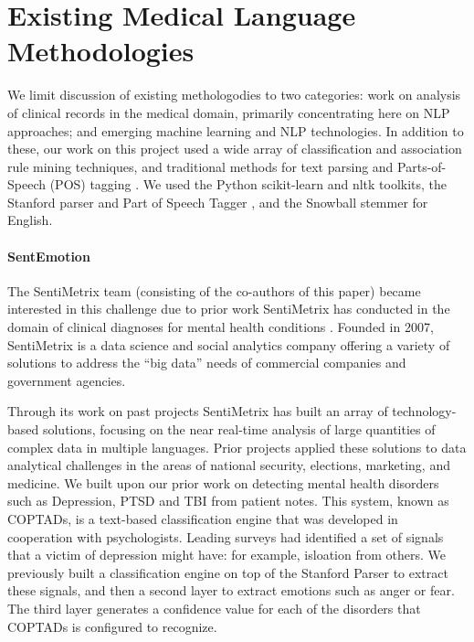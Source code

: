 \section{Existing Medical Language Methodologies}

We limit discussion of existing methologodies to two categories:
work on analysis of clinical records in the medical domain, primarily concentrating
here on NLP approaches; and emerging machine learning and NLP technologies.
In addition to these, our work on this project used a wide array of 
classification \cite{wu08} and association rule mining \cite{fpgrowth} techniques, and
traditional methods for text parsing and Parts-of-Speech (POS) tagging \cite{stanfordparser}. 
We used the Python \textsf{scikit-learn} \cite{scikit-learn} 
and \textsf{nltk} \cite{nltk} toolkits, the Stanford parser and Part of Speech Tagger \cite{stanfordparser}, and 
the Snowball stemmer for English\cite{snowball}. 

\paragraph{SentEmotion} 
The SentiMetrix team (consisting of the co-authors of this paper) became interested
in this challenge due to prior work SentiMetrix has conducted in the
domain of clinical diagnoses for mental health conditions \cite{coptads,coptads-book}.
Founded in 2007, SentiMetrix is a data science and social analytics company
offering a variety of solutions to address the “big data” needs of commercial companies and government agencies. 

Through its work on past projects \cite{dickerson14,kagan15,darpa} SentiMetrix has built an array of technology-based solutions, focusing on the near real-time analysis of large quantities of complex data in multiple languages. Prior projects
applied these solutions to data analytical challenges in the areas of national security, elections, marketing, and medicine.
We built upon our prior work on detecting mental health disorders such as Depression, PTSD and TBI from patient notes\cite{coptads,coptads-book}. This system, known as COPTADs, is a text-based classification engine that was developed in cooperation with psychologists. Leading surveys had identified a set of signals that a victim of depression might have: for example, isloation from others. We previously built a classification engine on top of the Stanford Parser \cite{stanfordparser} to extract these signals, 
and then a second layer to extract emotions such as anger or fear. The third layer generates a confidence value for each of the disorders that COPTADs is configured to recognize.


